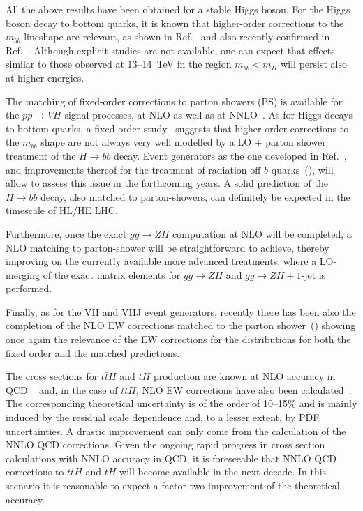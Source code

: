 All the above results have been obtained for a stable Higgs boson. For
the Higgs boson decay to bottom quarks, it is known that higher-order
corrections to the $m_{bb}$ lineshape are relevant, as shown in
Ref.~\cite{Ferrera:2017zex} and also recently confirmed
in Ref.~\cite{Caola:2017xuq}.  Although explicit studies are not available,
one can expect that effects similar to those observed at 13--14~TeV in
the region $m_{bb}<m_H$ will persist also at higher energies.

The matching of fixed-order corrections to parton showers (PS) is
available for the $pp\rightarrow VH$ signal processes, at NLO as well
as at NNLO~\cite{Astill:2016hpa,Astill:2018ivh}.
As for Higgs decays to bottom quarks, a fixed-order study~\cite{Caola:2017xuq}
suggests that higher-order corrections to the $m_{bb}$ shape are not always
very well modelled by a LO + parton shower treatment of the $H\to b\bar{b}$ decay.
Event generators as the one developed in Ref.~\cite{Astill:2018ivh}, and improvements thereof
for the treatment of radiation off $b$-quarks~(\cite{Buonocore:2017lry}),
will allow to assess this issue in the forthcoming
years. A solid prediction of the $H\to b\bar{b}$ decay, also matched to
parton-showers, can definitely be expected in the timescale of HL/HE LHC.

Furthermore, once the exact $gg\rightarrow ZH$ computation at NLO will
be completed, a NLO matching to parton-shower will be straightforward
to achieve, thereby improving on the currently available more advanced
treatments, where a LO-merging of the exact matrix elements for
$gg\rightarrow ZH$ and $gg\rightarrow ZH+1$-jet is performed.

Finally, as for the VH and VHJ event generators, recently there has been
also the completion of the NLO EW corrections matched to the parton
shower~(\cite{Granata:2017iod}) showing once again the relevance of the
EW corrections for the distributions for both the fixed order and the
matched predictions.

 

\label{sec:hl-lhc-ttH}
The cross sections for $t\bar t H$ and $tH$ production are known at NLO accuracy in QCD ~\cite{Beenakker:2001rj,Reina:2001sf,Biswas:2012bd} and, in the
case of $t \bar t H$, NLO EW corrections have also been calculated~\cite{Yu:2014cka,Frixione:2014qaa}. The corresponding
theoretical uncertainty is of the order of 10--15\% and is mainly induced by the
residual scale dependence and, to a lesser extent, by PDF uncertainties. A
drastic improvement can only come from the calculation of the NNLO QCD
corrections. Given the ongoing rapid progress in cross section calculations with NNLO accuracy in QCD, it is
foreseeable that NNLO QCD corrections to $t\bar t H$ and $tH$ will become available in the
next decade. In this scenario it is reasonable to expect a factor-two
improvement of the theoretical accuracy.

